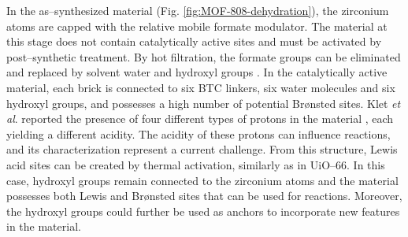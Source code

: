 In the as--synthesized material (Fig. \ref{fig:MOF-808-dehydration}), the zirconium atoms are capped with the relative mobile formate modulator. The material at this stage does not contain catalytically active sites and must be activated by post--synthetic treatment. By hot filtration, the formate groups can be eliminated and replaced by solvent water and hydroxyl groups \cite{plessers2016zr, mautschke2018catalytic}. In the catalytically active material, each brick is connected to six BTC linkers, six water molecules and six hydroxyl groups, and possesses a high number of potential Br\o{}nsted sites. Klet \textit{et al}. reported the presence of four different types of protons in the material \cite{klet2016evaluation}, each yielding a different acidity. The acidity of these protons can influence reactions, and its characterization represent a current challenge. From this structure, Lewis acid sites can be created by thermal activation, similarly as in UiO--66. In this case, hydroxyl groups remain connected to the zirconium atoms and the material possesses both Lewis and Br\o{}nsted sites that can be used for reactions. Moreover, the hydroxyl groups could further be used as anchors to incorporate new features in the material. 


